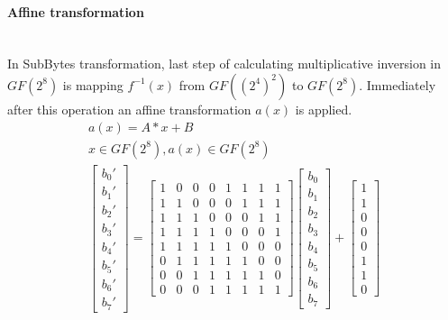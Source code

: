 \paragraph{Affine transformation}\mbox{}\\
In SubBytes transformation, last step of calculating multiplicative inversion in $GF(2^8)$ is mapping $f^{-1}(x)$ from $GF((2^4)^2)$ to $GF(2^8)$. Immediately after this operation an affine transformation $a(x)$ is applied.
\begin{equation}
\begin{gathered}
\label{eq:affine}
a(x) = A * x + B\\
x \in GF(2^8), a(x) \in GF(2^8) \\
\begin{bmatrix}
b_0'\\b_1'\\b_2'\\b_3'\\b_4'\\b_5'\\b_6'\\b_7'
\end{bmatrix}
=
\begin{bmatrix}
    1 & 0 & 0 & 0 & 1 & 1 & 1 & 1 \\
    1 & 1 & 0 & 0 & 0 & 1 & 1 & 1 \\
    1 & 1 & 1 & 0 & 0 & 0 & 1 & 1 \\
    1 & 1 & 1 & 1 & 0 & 0 & 0 & 1 \\
    1 & 1 & 1 & 1 & 1 & 0 & 0 & 0 \\
    0 & 1 & 1 & 1 & 1 & 1 & 0 & 0 \\
    0 & 0 & 1 & 1 & 1 & 1 & 1 & 0 \\
    0 & 0 & 0 & 1 & 1 & 1 & 1 & 1
\end{bmatrix}
\begin{bmatrix}
b_0\\b_1\\b_2\\b_3\\b_4\\b_5\\b_6\\b_7
\end{bmatrix}
+
\begin{bmatrix}
1\\1\\0\\0\\0\\1\\1\\0
\end{bmatrix}
\end{gathered}
\end{equation}

